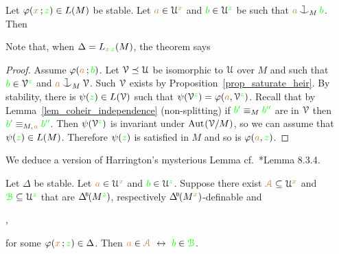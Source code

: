 \begin{theorem}[ (Symmetry)]\label{thm_symmetry}
  Let $\varphi({\color{brown} x}\,;{\color{green} z})\in L(M)$ be stable.
  Let ${\color{brown} a}\in\EuScript U^{\color{brown} x}$ and ${\color{green} b}\in\EuScript U^{\color{green} z}$ be such that ${\mr a}\cnonfork_M{\gr b}$.
  Then\smallskip

\end{theorem}

Note that, when $\Delta= L_{{\color{brown} x}\,{\color{green} z}}(M)$, the theorem says


\vspace*{-\parskip}
\begin{proof}
  Assume $\varphi({\color{brown} a}\,;{\color{green} b})$.
  Let $\EuScript V\preceq\EuScript U$ be isomorphic to $\EuScript U$ over $M$ and such that ${\color{green} b}\in\EuScript V^{\color{green} z}$ and ${\mr a}\cnonfork_M\V$. Such $\EuScript V$ exists by Proposition~\ref{prop_saturate_heir}.
  By stability, there is $\psi({\color{green} z})\in L(\EuScript V)$ such that $\psi(\EuScript V^{\color{green} z})=\varphi({\color{brown} a},\EuScript V^{\color{green} z})$.
  Recall that by Lemma~\ref{lem_coheir_independence} (non-splitting) if ${\color{green} b'}\equiv_M{\color{green} b''}$ are in $\EuScript V$ then ${\color{green} b'}\equiv_{M,\kern.2ex{\color{brown} a}}{\color{green} b''}$.
  Then $\psi(\EuScript V^{\color{green} z})$ is invariant under ${\rm Aut\kern.15ex}(\EuScript V/M)$, so we can assume that $\psi({\color{green} z})\in L(M)$.
  Therefore $\psi({\color{green} z})$ is satisfied in $M$ and so is $\varphi({\color{brown} a},{\color{green} z})$.
\end{proof}

We deduce a version of Harrington's mysterious Lemma cf.~\cite{TZ}*{Lemma 8.3.4}.


\begin{corollary}\label{corol_harrington0}
  Let $\Delta$ be stable.
  Let ${\color{brown} a}\in\EuScript U^{\color{brown} x}$ and ${\color{green} b}\in\EuScript U^{\color{green} z}$. 
  Suppose there exist ${\color{brown}\EuScript A}\subseteq\EuScript U^{\color{brown} x}$ and ${\color{green}\EuScript B}\subseteq\EuScript U^{\color{green} z}$ that are $\BDelta(M^{\gr z})$, respectively $\BDelta(M^{\mr x})$-definable and \smallskip

  \smallskip

  ,\smallskip

  for some $\varphi({\color{brown} x}\,;{\color{green} z})\in\Delta$.
  Then ${\mr a}\in\mrA\ \iff\ {\gr b}\in\grB$.
\end{corollary}

